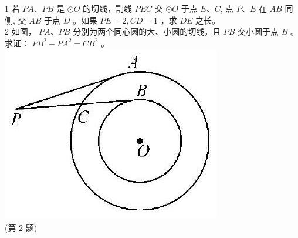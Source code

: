 \documentclass[10pt]{article}
\begin{document}
1 若 $P A 、 P B$ 是 $\odot O$ 的切线，割线 $P E C$ 交 $\odot O$ 于点 $E 、 C$, 点 $P 、 E$ 在 $A B$ 同侧, 交 $A B$ 于点 $D$ 。如果 $P E=2, C D=1$ ，求 $D E$ 之长。\\
2 如图， $P A 、 P B$ 分别为两个同心圆的大、小圆的切线，且 $P B$ 交小圆于点 $B$ 。\\
求证： $P B^{2}-P A^{2}=C B^{2}$ 。\\
\includegraphics[max width=\textwidth, center]{2024_10_30_66b8e5e701da2093c133g-063(3)}\\
(第 2 题)
\end{document}
